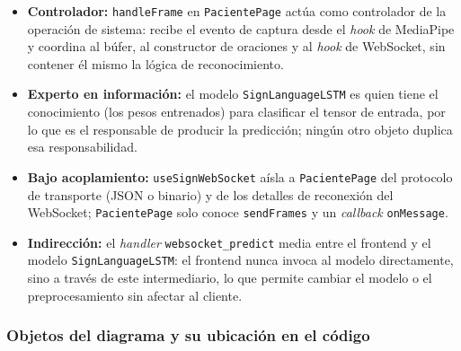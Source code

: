 \begin{itemize}[leftmargin=*, itemsep=2pt]
    \item \textbf{Controlador:} \texttt{handleFrame} en \texttt{PacientePage}
    actúa como controlador de la operación de sistema: recibe el evento de
    captura desde el \textit{hook} de MediaPipe y coordina al búfer, al
    constructor de oraciones y al \textit{hook} de WebSocket, sin contener
    él mismo la lógica de reconocimiento.
    \item \textbf{Experto en información:} el modelo \texttt{SignLanguageLSTM}
    es quien tiene el conocimiento (los pesos entrenados) para clasificar el
    tensor de entrada, por lo que es el responsable de producir la
    predicción; ningún otro objeto duplica esa responsabilidad.
    \item \textbf{Bajo acoplamiento:} \texttt{useSignWebSocket} aísla a
    \texttt{PacientePage} del protocolo de transporte (JSON o binario) y de
    los detalles de reconexión del WebSocket; \texttt{PacientePage} solo
    conoce \texttt{sendFrames} y un \textit{callback} \texttt{onMessage}.
    \item \textbf{Indirección:} el \textit{handler}
    \texttt{websocket\_predict} media entre el frontend y el modelo
    \texttt{SignLanguageLSTM}: el frontend nunca invoca al modelo
    directamente, sino a través de este intermediario, lo que permite
    cambiar el modelo o el preprocesamiento sin afectar al cliente.
\end{itemize}

\subsubsection{Objetos del diagrama y su ubicación en el código}

